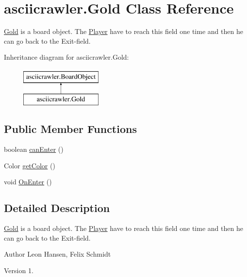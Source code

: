 \hypertarget{classasciicrawler_1_1Gold}{}\section{asciicrawler.\+Gold Class Reference}
\label{classasciicrawler_1_1Gold}


\hyperlink{classasciicrawler_1_1Gold}{Gold} is a board object. The \hyperlink{classasciicrawler_1_1Player}{Player} have to reach this field one time and then he can go back to the Exit-\/field.  


Inheritance diagram for asciicrawler.\+Gold\+:\begin{figure}[H]
\begin{center}
\leavevmode
\includegraphics[height=2.000000cm]{classasciicrawler_1_1Gold}
\end{center}
\end{figure}
\subsection*{Public Member Functions}
\begin{DoxyCompactItemize}
\item 
boolean \hyperlink{classasciicrawler_1_1Gold_a383c92b41ae941567353150c3fc5c9b3}{can\+Enter} ()
\item 
Color \hyperlink{classasciicrawler_1_1Gold_a52713aa4b67ea23f2b729bb17034eb9e}{get\+Color} ()
\item 
void \hyperlink{classasciicrawler_1_1Gold_a663ee19ca7e6f0b0b518bd977df8b97b}{On\+Enter} ()
\end{DoxyCompactItemize}


\subsection{Detailed Description}
\hyperlink{classasciicrawler_1_1Gold}{Gold} is a board object. The \hyperlink{classasciicrawler_1_1Player}{Player} have to reach this field one time and then he can go back to the Exit-\/field. 

\begin{DoxyAuthor}{Author}
Leon Hansen, Felix Schmidt 
\end{DoxyAuthor}
\begin{DoxyVersion}{Version}
1. 
\end{DoxyVersion}


